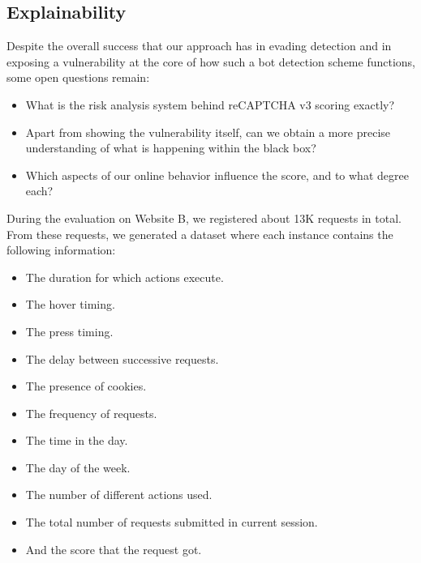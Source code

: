 \subsection{Explainability}

Despite the overall success that our approach has in evading detection and in exposing a vulnerability at the core of how such a bot detection scheme functions, some open questions remain:
\begin{itemize}
    \item What is the risk analysis system behind reCAPTCHA v3 scoring exactly?
    \item Apart from showing the vulnerability itself, can we obtain a more precise understanding of what is happening within the black box?
    \item Which aspects of our online behavior influence the score, and to what degree each?
\end{itemize}

During the evaluation on Website B, we registered about 13K requests in total.
From these requests, we generated a dataset where each instance contains the following information:
\begin{itemize}
    \item The duration for which actions execute.
    \item The hover timing.
    \item The press timing.
    \item The delay between successive requests.
    \item The presence of cookies.
    \item The frequency of requests.
    \item The time in the day.
    \item The day of the week.
    \item The number of different actions used.
    \item The total number of requests submitted in current session.
    \item And the score that the request got.
\end{itemize}

